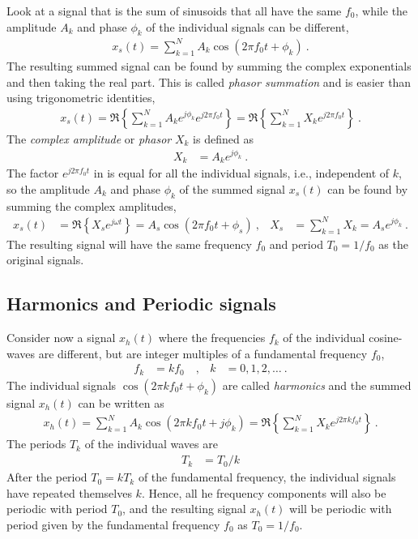 Look at a signal that is the sum of sinusoids that all have the same $f_0$, while the amplitude $A_k$ and phase $\phi_k$ of the individual signals can be different, 
\begin{align}
	x_s(t)= \sum_{k=1}^{N} A_k \cos(2\pi f_0 t + \phi_k)   \:.
\end{align}
The resulting summed signal can be found by summing the complex exponentials and then taking the real part. This is called \emph{phasor summation} and is  easier than using trigonometric identities, 
\begin{align}
	x_s(t)= \Re\left\{ \sum_{k=1}^{N}  A_k e^{j\phi_k} e^{j2\pi f_0 t } \right\}  
			= \Re\left\{ \sum_{k=1}^{N}  X_k  e^{j2\pi f_0 t } \right\}  \:.
	\label{eq:phasorsum}
\end{align}
The \emph{complex amplitude }or \emph{phasor} $X_k$ is defined as 
\begin{align}
	X_k &= A_k e^{j\phi_k} \:.
\end{align}
The factor $ e^{j2\pi f_0 t}$ in  is equal for all the individual signals, i.e., independent of $k$, so the amplitude $A_k$ and phase $\phi_k$ of the summed signal $x_s(t)$ can be found by summing the complex amplitudes, 
\begin{align}
	x_s(t)&= \Re \left\{ X_s e^{j\omega t } \right\} = A_s \cos(2\pi f_0 t + \phi_s)  \:,
	 &  X_s&= \sum_{k=1}^{N} X_k = A_s e^{j\phi_k}  \:.
\end{align}
The resulting signal will have the same frequency $f_0$ and period $T_0=1/f_0$ as the original signals. 

\subsection{Harmonics and Periodic signals}
Consider now a signal $x_h(t)$ where the frequencies $f_k$ of the individual cosine-waves are different, but are integer multiples of a fundamental frequency $f_0$, 
\begin{align}
	f_k& = k f_0 \quad , & k&= 0,1,2, \ldots \:.
\end{align}
The individual signals $\cos(2\pi k f_0 t +\phi_k)$ are called \emph{harmonics} and the summed signal $x_h(t)$ can be written as
\begin{align}
	x_h(t)= \sum_{k=1}^{N}  A_k \cos(2\pi k f_0 t +j\phi_k)
	= \Re\left\{ \sum_{k=1}^{N}  X_k  e^{j2\pi k f_0 t } \right\}  \:.
	\label{eq:harmonicsum}
\end{align}
The periods $T_k$ of the individual waves are 
\begin{align}
	T_k &= T_0/k
\end{align}
After the period $T_0=k T_k$ of the fundamental frequency, the individual signals have repeated themselves $k$. Hence, all he frequency components will also be periodic with period $T_0$, and the resulting signal $x_h(t)$ will be periodic with period given by the fundamental frequency $f_0$ as $T_0=1/f_0$.

